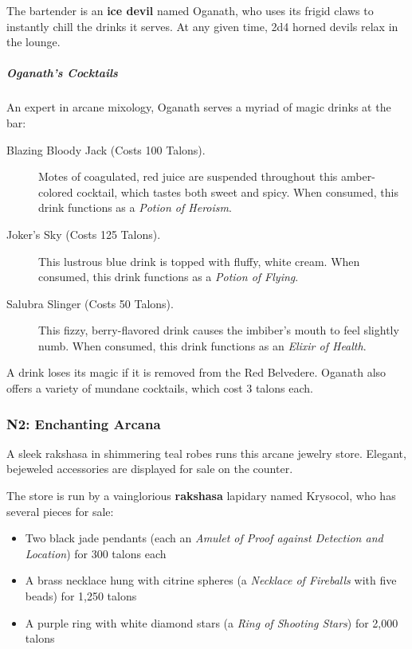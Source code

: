 \documentclass[10pt,a4paper,twoside,bg=print,twocolumn,openany,nodeprecatedcode]{dndbook}
\begin{document}
The bartender is an \textbf{ice devil} named Oganath, who uses its frigid claws to instantly chill the drinks it serves. At any given time, 2d4 horned devils relax in the lounge.

\subparagraph{Oganath's Cocktails}
An expert in arcane mixology, Oganath serves a myriad of magic drinks at the bar:


\begin{description}
\item[Blazing Bloody Jack (Costs 100 Talons).]
Motes of coagulated, red juice are suspended throughout this amber-colored cocktail, which tastes both sweet and spicy. When consumed, this drink functions as a \textit{Potion of Heroism}.
\item[Joker's Sky (Costs 125 Talons).]
This lustrous blue drink is topped with fluffy, white cream. When consumed, this drink functions as a \textit{Potion of Flying}.
\item[Salubra Slinger (Costs 50 Talons).]
This fizzy, berry-flavored drink causes the imbiber's mouth to feel slightly numb. When consumed, this drink functions as an \textit{Elixir of Health}.
\end{description}

A drink loses its magic if it is removed from the Red Belvedere. Oganath also offers a variety of mundane cocktails, which cost 3 talons each.

\subsubsection{N2: Enchanting Arcana}
\begin{DndReadAloud}{}
A sleek rakshasa in shimmering teal robes runs this arcane jewelry store. Elegant, bejeweled accessories are displayed for sale on the counter.

\end{DndReadAloud}

The store is run by a vainglorious \textbf{rakshasa} lapidary named Krysocol, who has several pieces for sale:


\begin{itemize}
\item Two black jade pendants (each an \textit{Amulet of Proof against Detection and Location}) for 300 talons each
\item A brass necklace hung with citrine spheres (a \textit{Necklace of Fireballs} with five beads) for 1,250 talons
\item A purple ring with white diamond stars (a \textit{Ring of Shooting Stars}) for 2,000 talons
\end{itemize}
\end{document}
